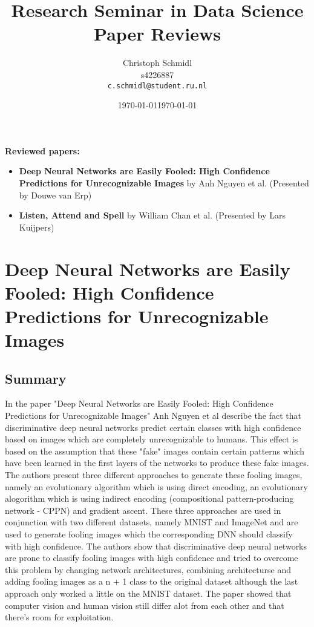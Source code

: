 \documentclass[a4paper]{article}
\title{Research Seminar in Data Science\\Paper Reviews}
\author{
  Christoph Schmidl\\ s4226887\\      \texttt{c.schmidl@student.ru.nl}
}
\date{\today}
\date{\today}
\begin{document}
\maketitle

\textbf{Reviewed papers:}

\begin{itemize}
	\item \textbf{Deep Neural Networks are Easily Fooled: High Confidence Predictions for Unrecognizable Images} by Anh Nguyen et al. (Presented by Douwe van Erp)
	\item \textbf{Listen, Attend and Spell} by William Chan et al. (Presented by Lars Kuijpers)
\end{itemize}


\section{Deep Neural Networks are Easily Fooled: High Confidence Predictions for Unrecognizable Images}

\subsection{Summary}

In the paper "Deep Neural Networks are Easily Fooled: High Confidence Predictions for Unrecognizable Images" Anh Nguyen et al describe the fact that discriminative deep neural networks predict certain classes with high confidence based on images which are completely unrecognizable to humans. This effect is based on the assumption that these "fake" images contain certain patterns which have been learned in the first layers of the networks to produce these fake images. The authors present three different approaches to generate these fooling images, namely an evolutionary algorithm which is using direct encoding, an evolutionary alogorithm which is using indirect encoding (compositional pattern-producing network - CPPN) and gradient ascent. These three approaches are used in conjunction with two different datasets, namely MNIST and ImageNet and are used to generate fooling images which the corresponding DNN should classify with high confidence. The authors show that discriminative deep neural networks are prone to classify fooling images with high confidence and tried to overcome this problem by changing network architectures, combining architecturse and adding fooling images as a n + 1 class to the original dataset although the last approach only worked a little on the MNIST dataset. The paper showed that computer vision and human vision still differ alot from each other and that there's room for exploitation.
\end{document}
